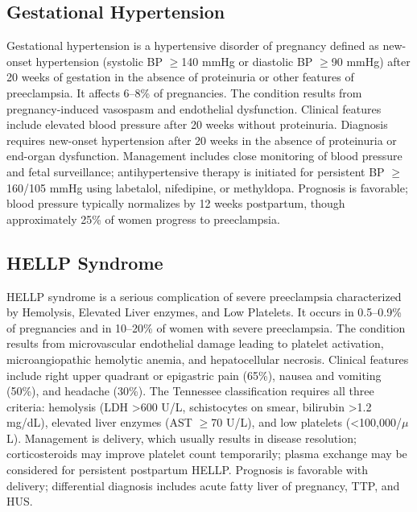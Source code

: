 \subsection{Gestational Hypertension}
\label{sec:Gestational Hypertension}
Gestational hypertension is a hypertensive disorder of pregnancy defined as new-onset hypertension (systolic BP $\ge$140 mmHg or diastolic BP $\ge$90 mmHg) after 20 weeks of gestation in the absence of proteinuria or other features of preeclampsia. It affects 6--8\% of pregnancies. The condition results from pregnancy-induced vasospasm and endothelial dysfunction. Clinical features include elevated blood pressure after 20 weeks without proteinuria. Diagnosis requires new-onset hypertension after 20 weeks in the absence of proteinuria or end-organ dysfunction. Management includes close monitoring of blood pressure and fetal surveillance; antihypertensive therapy is initiated for persistent BP $\ge$160/105 mmHg using labetalol, nifedipine, or methyldopa. Prognosis is favorable; blood pressure typically normalizes by 12 weeks postpartum, though approximately 25\% of women progress to preeclampsia.

\subsection{HELLP Syndrome}
\label{sec:HELLP Syndrome}
HELLP syndrome is a serious complication of severe preeclampsia characterized by Hemolysis, Elevated Liver enzymes, and Low Platelets. It occurs in 0.5--0.9\% of pregnancies and in 10--20\% of women with severe preeclampsia. The condition results from microvascular endothelial damage leading to platelet activation, microangiopathic hemolytic anemia, and hepatocellular necrosis. Clinical features include right upper quadrant or epigastric pain (65\%), nausea and vomiting (50\%), and headache (30\%). The Tennessee classification requires all three criteria: hemolysis (LDH >600 U/L, schistocytes on smear, bilirubin >1.2 mg/dL), elevated liver enzymes (AST $\ge$70 U/L), and low platelets (<100,000/$\mu$L). Management is delivery, which usually results in disease resolution; corticosteroids may improve platelet count temporarily; plasma exchange may be considered for persistent postpartum HELLP. Prognosis is favorable with delivery; differential diagnosis includes acute fatty liver of pregnancy, TTP, and HUS.

